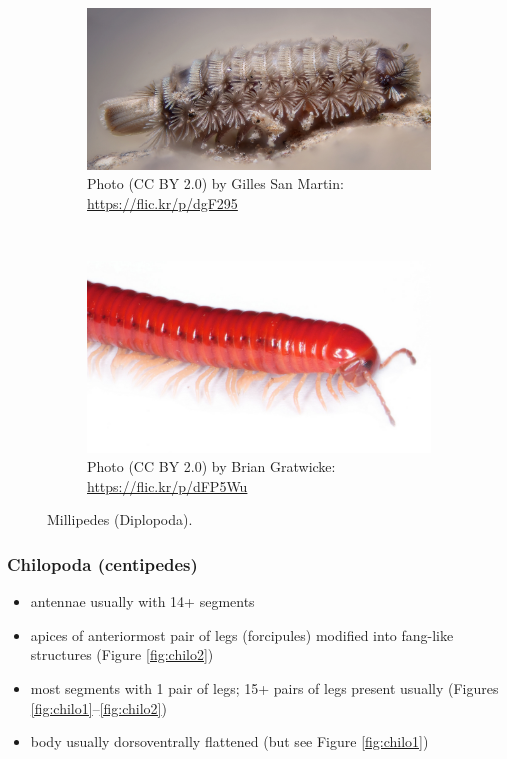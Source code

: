 \documentclass[letterpaper, 11pt]{article}
\begin{document}
\begin{figure}[ht!]
    \centering
    \begin{subfigure}[ht!]{0.35\textwidth}
        \includegraphics[width=\textwidth]{diplop1}
        \caption{Photo (CC BY 2.0) by Gilles San Martin: \url{https://flic.kr/p/dgF295}}
        \label{fig:diplop1}
    \end{subfigure}
    ~ %
    \begin{subfigure}[ht!]{0.55\textwidth}
        \includegraphics[width=\textwidth]{diplop2}
        \caption{Photo (CC BY 2.0) by Brian Gratwicke: \url{https://flic.kr/p/dFP5Wu}}
        \label{fig:diplop2}
    \end{subfigure}
    \caption{Millipedes (Diplopoda).} \label{fig:diplopoda}
\end{figure}

\subsubsection*{Chilopoda (centipedes)}
\begin{itemize}
\item antennae usually with 14+ segments
\item apices of anteriormost pair of legs (forcipules) modified into fang-like structures (Figure \ref{fig:chilo2})
\item most segments with 1 pair of legs; 15+ pairs of legs present usually (Figures \ref{fig:chilo1}--\ref{fig:chilo2})
\item body usually dorsoventrally flattened (but see Figure \ref{fig:chilo1})
\end{itemize}
\end{document}
